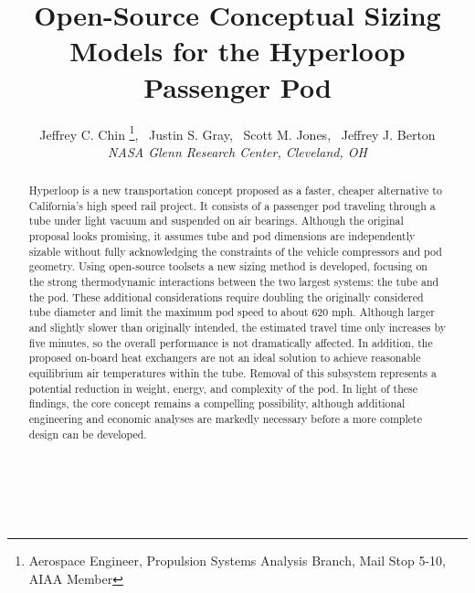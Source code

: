 \documentclass[]             %
{aiaa-tc}                       %
\title{Open-Source Conceptual Sizing Models for the Hyperloop Passenger Pod}
\author{
  Jeffrey C. Chin%
     \footnote{Aerospace Engineer, Propulsion Systems Analysis Branch, Mail Stop 5-10, AIAA Member},
  \ Justin S. Gray\footnotemark[\value{footnote}] ,%
  \ Scott M. Jones\footnotemark[\value{footnote}] ,%
  \ Jeffrey J. Berton\footnotemark[\value{footnote}]%
   \\
  {\normalsize\itshape
  NASA Glenn Research Center, Cleveland, OH}
}
\begin{document}
\maketitle

\begin{abstract}
Hyperloop is a new transportation concept proposed as a faster, cheaper alternative to California's high speed rail project.
It consists of a passenger pod traveling through a tube under light vacuum and suspended on air bearings.
Although the original proposal looks promising,
it assumes tube and pod dimensions are independently sizable without fully acknowledging
the constraints of the vehicle compressors and pod geometry.
Using open-source toolsets a new sizing method is developed, focusing on 
the strong thermodynamic interactions between the two largest systems: the tube and the pod.
These additional considerations require doubling the originally considered tube diameter
and limit the maximum pod speed to about 620 mph.
Although larger and slightly slower than originally intended, the estimated travel time only increases by five minutes,
so the overall performance is not dramatically affected.
In addition, the proposed on-board heat exchangers are not an ideal solution
to achieve reasonable equilibrium air temperatures within the tube.
Removal of this subsystem represents a potential reduction in weight, energy, and complexity of the pod.
In light of these findings, the core concept remains a compelling possibility,
although additional engineering and economic analyses are markedly necessary before a more complete design can be developed.
\\
\\
\\
\\

\end{abstract}  

\setcounter{secnumdepth}{1}
\setcounter{tocdepth}{1}
\printnomenclature
 





\end{document}
